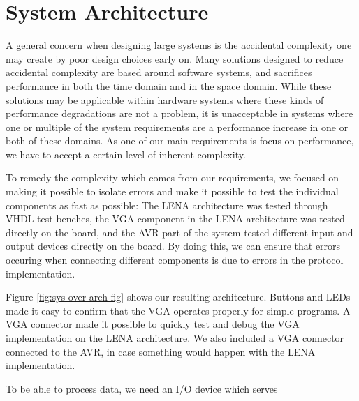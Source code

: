 \section{System Architecture}



A general concern when designing large systems is the accidental
complexity\cite[p.~8-9]{holt2004uml} one may create by poor design choices early
on. Many solutions designed to reduce accidental complexity are based around
software systems, and sacrifices performance in both the time domain and in the
space domain\cite{moseley2006out}. While these solutions may be applicable
within hardware systems where these kinds of performance degradations are not a
problem, it is unacceptable in systems where one or multiple of the system
requirements are a performance increase in one or both of these domains. As one
of our main requirements is focus on performance, we have to accept a certain
level of inherent complexity.

To remedy the complexity which comes from our requirements, we focused on making
it possible to isolate errors and make it possible to test the individual
components as fast as possible: The LENA architecture was tested through VHDL
test benches, the VGA component in the LENA architecture was tested directly on
the board, and the AVR part of the system tested different input and output
devices directly on the board. By
doing this, we can ensure that errors occuring when connecting different
components is due to errors in the protocol implementation.

Figure \ref{fig:sys-over-arch-fig} shows our resulting architecture. Buttons and
LEDs made it easy to confirm that the VGA operates properly for simple
programs. A VGA connector made it possible to quickly test and debug the VGA
implementation on the LENA architecture. We also included a VGA connector
connected to the AVR, in case something would happen with the LENA
implementation.

To be able to process data, we need an I/O device which serves
